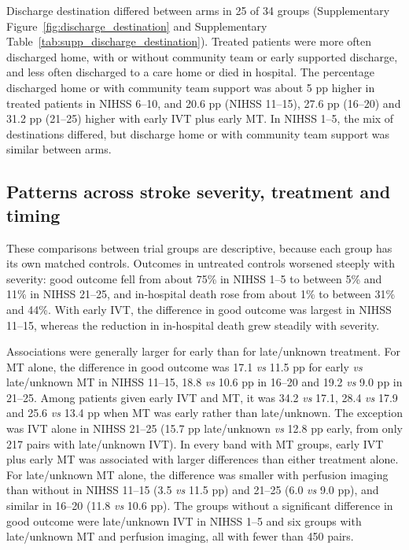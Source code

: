 Discharge destination differed between arms in 25 of 34 groups (Supplementary Figure~\ref{fig:discharge_destination} and Supplementary Table~\ref{tab:supp_discharge_destination}). Treated patients were more often discharged home, with or without community team or early supported discharge, and less often discharged to a care home or died in hospital. The percentage discharged home or with community team support was about 5 pp higher in treated patients in NIHSS 6--10, and 20.6 pp (NIHSS 11--15), 27.6 pp (16--20) and 31.2 pp (21--25) higher with early IVT plus early MT. In NIHSS 1--5, the mix of destinations differed, but discharge home or with community team support was similar between arms.

\subsection{Patterns across stroke severity, treatment and timing}

These comparisons between trial groups are descriptive, because each group has its own matched controls. Outcomes in untreated controls worsened steeply with severity: good outcome fell from about 75\% in NIHSS 1--5 to between 5\% and 11\% in NIHSS 21--25, and in-hospital death rose from about 1\% to between 31\% and 44\%. With early IVT, the difference in good outcome was largest in NIHSS 11--15, whereas the reduction in in-hospital death grew steadily with severity.

Associations were generally larger for early than for late/unknown treatment. For MT alone, the difference in good outcome was 17.1 \textit{vs} 11.5 pp for early \textit{vs} late/unknown MT in NIHSS 11--15, 18.8 \textit{vs} 10.6 pp in 16--20 and 19.2 \textit{vs} 9.0 pp in 21--25. Among patients given early IVT and MT, it was 34.2 \textit{vs} 17.1, 28.4 \textit{vs} 17.9 and 25.6 \textit{vs} 13.4 pp when MT was early rather than late/unknown. The exception was IVT alone in NIHSS 21--25 (15.7 pp late/unknown \textit{vs} 12.8 pp early, from only 217 pairs with late/unknown IVT). In every band with MT groups, early IVT plus early MT was associated with larger differences than either treatment alone. For late/unknown MT alone, the difference was smaller with perfusion imaging than without in NIHSS 11--15 (3.5 \textit{vs} 11.5 pp) and 21--25 (6.0 \textit{vs} 9.0 pp), and similar in 16--20 (11.8 \textit{vs} 10.6 pp). The groups without a significant difference in good outcome were late/unknown IVT in NIHSS 1--5 and six groups with late/unknown MT and perfusion imaging, all with fewer than 450 pairs.

